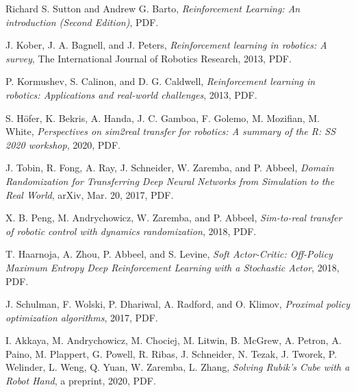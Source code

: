 \documentclass[12pt]{article}
\begin{document}

\begin{thebibliography}{9}
    Richard S. Sutton and Andrew G. Barto,
    \textit{Reinforcement Learning: An introduction (Second Edition)},
    PDF.
    
    J. Kober, J. A. Bagnell, and J. Peters,
    \textit{Reinforcement learning in robotics: A survey},
    The International Journal of Robotics Research, 2013, PDF.
    
    P. Kormushev, S. Calinon, and D. G. Caldwell,
    \textit{Reinforcement learning in robotics: Applications and real-world challenges},
    2013, PDF.
    
    S. Höfer, K. Bekris, A. Handa, J. C. Gamboa, F. Golemo, M. Mozifian, M. White,
    \textit{Perspectives on sim2real transfer for robotics: A summary of the R: SS 2020 workshop},
    2020, PDF.
    
    J. Tobin, R. Fong, A. Ray, J. Schneider, W. Zaremba, and P. Abbeel,
    \textit{Domain Randomization for Transferring Deep Neural Networks from Simulation to the Real World},
    arXiv, Mar. 20, 2017, PDF.
    
    X. B. Peng, M. Andrychowicz, W. Zaremba, and P. Abbeel,
    \textit{Sim-to-real transfer of robotic control with dynamics randomization},
    2018, PDF.

    T. Haarnoja, A. Zhou, P. Abbeel, and S. Levine,
    \textit{Soft Actor-Critic: Off-Policy Maximum Entropy Deep Reinforcement Learning with a Stochastic Actor},
    2018, PDF.

    J. Schulman, F. Wolski, P. Dhariwal, A. Radford, and O. Klimov,
    \textit{Proximal policy optimization algorithms},
    2017, PDF.

    I. Akkaya, M. Andrychowicz, M. Chociej, M. Litwin, B. McGrew, A. Petron, A. Paino, M. Plappert, G. Powell, R. Ribas, J. Schneider, N. Tezak, J. Tworek, P. Welinder, L. Weng, Q. Yuan, W. Zaremba, L. Zhang,
    \textit{Solving Rubik’s Cube with a Robot Hand}, a preprint, 2020, PDF.


\end{thebibliography}
\end{document}

